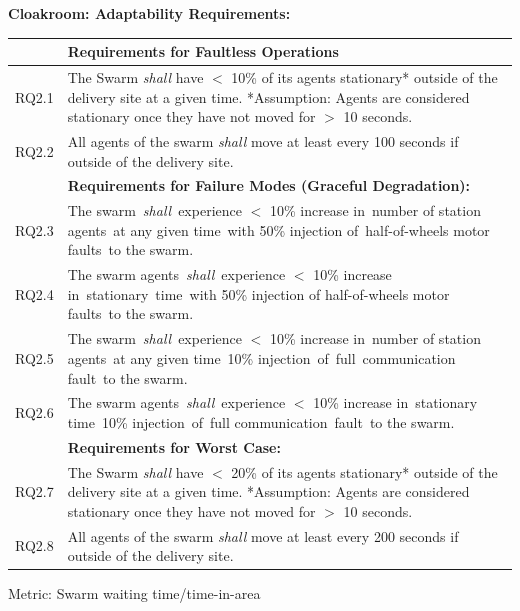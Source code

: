 \documentclass[lettersize,journal]{IEEEtran}
\begin{document}
\noindent \textbf{Cloakroom: Adaptability Requirements: }
\begin{center}
	\begin{tabular}{|p{7mm}|p{72mm}|}
		\hline
		& \textbf{Requirements for Faultless Operations} \\
		\hline
		RQ2.1 & The Swarm \emph{shall} have $<$ 10\% of its agents stationary* outside of the delivery site at a given time.
		*Assumption: Agents are considered stationary once they have not moved for $>$ 10 seconds.
		 \\ 
		\hline
		RQ2.2 & All agents of the swarm \emph{shall} move at least every 100 seconds if outside of the delivery site. \\ 
		\hline
		& \textbf{Requirements for Failure Modes (Graceful Degradation): } \\
		\hline
		RQ2.3 & The swarm \emph{shall} experience $<$ 10\% increase in number of station agents at any given time with 50\% injection of half-of-wheels motor faults to the swarm. \\
		\hline
		RQ2.4 & The swarm agents \emph{shall} experience $<$ 10\% increase in stationary time with 50\% injection of half-of-wheels motor faults to the swarm.\\ 
		\hline
		RQ2.5 & The swarm \emph{shall} experience $<$ 10\% increase in number of station agents at any given time 10\% injection of full communication fault to the swarm.\\
		\hline
		RQ2.6 & The swarm agents \emph{shall} experience $<$ 10\% increase in stationary time 10\% injection of full communication fault to the swarm. \\	
		\hline
		& \textbf{Requirements for Worst Case: } \\
		\hline
		RQ2.7 & The Swarm \emph{shall} have $<$ 20\% of its agents stationary* outside of the delivery site at a given time.
		*Assumption: Agents are considered stationary once they have not moved for $>$ 10 seconds. \\			\hline	
		RQ2.8 & All agents of the swarm \emph{shall} move at least every 200 seconds if outside of the delivery site.\\		[1ex] 		
		\hline
	\end{tabular}
\end{center}

\noindent Metric: Swarm waiting time/time-in-area
\end{document}
